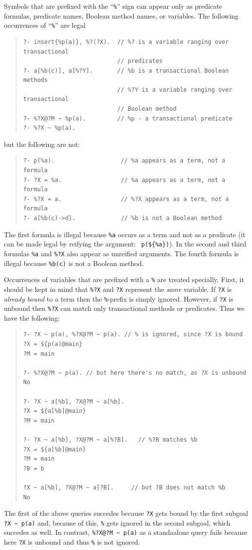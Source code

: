 \documentclass[11pt]{article}
\begin{document}
Symbols that are prefixed with the ``\verb|%|'' sign
can appear only as predicate formulas, predicate names, Boolean
method names, or variables.  
The following occurrences of ``\verb|%|'' are legal
\begin{quote}
\begin{verbatim}
?- insert{%p(a)}, %?(?X).  // %? is a variable ranging over transactional 
                           // predicates
?- a[%b(c)], a[%?Y].       // %b is a transactional Boolean methods
                           // %?Y is a variable ranging over transactional
                           // Boolean method
?- %?X@?M ~ %p(a).         // %p - a transactional predicate
?- %?X ~ %p(a).

\end{verbatim}
\end{quote}
but the following are not:
\begin{quote}
\begin{verbatim}
?- p(%a).                   // %a appears as a term, not a formula
?- ?X = %a.                 // %a appears as a term, not a formula
?- %?X = a.                 // %?X appears as a term, not a formula
?- a[%b(c)->d].             // %b is not a Boolean method
\end{verbatim}
\end{quote}
The first formula is illegal because {\tt \%a} occurs as a term and not
as a predicate (it can be made legal by reifying the argument: {\tt
p(\$\{\%a\})}). In the second and third formulas {\tt \%a} and {\tt \%?X}
also appear as unreified arguments. The fourth formula is illegal
because {\tt \%b(c)} is not a Boolean method. 

Occurrences of variables that are prefixed with  a {\tt \%} are treated
specially.  First, it should be kept in mind that {\tt \%?X} and {\tt ?X}
represent the \emph{same} variable.
If {\tt ?X} is \emph{already bound} to
a term then the \texttt{\%}-prefix is simply ignored. However, if
\texttt{?X} is unbound then {\tt \%?X} can match only transactional methods
or predicates. 
Thus we have the following:
\begin{quote}
\begin{verbatim}
?- ?X ~ p(a), %?X@?M ~ p(a). // % is ignored, since ?X is bound
?X = ${p(a)@main}
?M = main

?- %?X@?M ~ p(a). // but here there's no match, as ?X is unbound
No

?- ?X ~ a[%b], ?X@?M ~ a[%b].  
?X = ${a[%b]@main}
?M = main

?- ?X ~ a[%b], ?X@?M ~ a[%?B].   // %?B matches %b
?X = ${a[%b]@main}
?M = main
?B = b

?X ~ a[%b], ?X@?M ~ a[?B].     // but ?B does not match %b
No
\end{verbatim}
\end{quote}
The first of the above queries succedes because \texttt{?X} gets bound by
the first subgoal \verb|?X ~ p(a)| and, because of this, \texttt{\%} gets
ignored in the second subgoal, which succedes as well. 
In contrast, \verb|%?X@?M ~ p(a)|
as a standaalone query fails because here \texttt{?X} is unbound and thus
\texttt{\%}  is not ignored.
\end{document}
